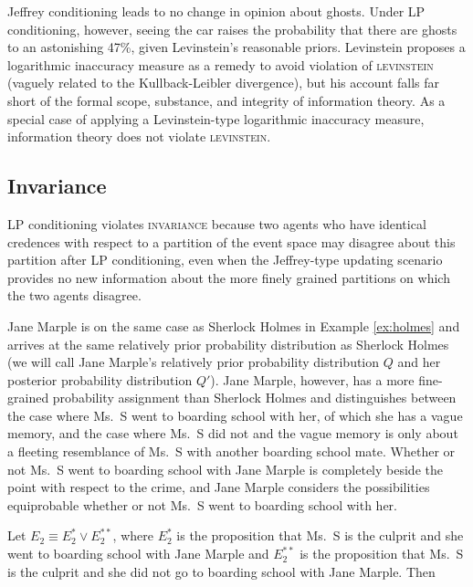 \documentclass[11pt]{article}
\begin{document}
Jeffrey conditioning leads to no change in opinion about ghosts. Under
LP conditioning, however, seeing the car raises the probability that
there are ghosts to an astonishing 47\%, given Levinstein's reasonable
priors. Levinstein proposes a logarithmic inaccuracy measure as a
remedy to avoid violation of \textsc{levinstein} (vaguely related to
the Kullback-Leibler divergence), but his account falls far short of
the formal scope, substance, and integrity of information theory.
As a special case of applying a Levinstein-type logarithmic inaccuracy
measure, information theory does not violate \textsc{levinstein}.

\subsection{Invariance}
\label{Invariance}

LP conditioning violates \textsc{invariance} because two agents who
have identical credences with respect to a partition of the event
space may disagree about this partition after LP conditioning, even
when the Jeffrey-type updating scenario provides no new information
about the more finely grained partitions on which the two agents
disagree. 

\begin{quotex}
  \label{ex:marple} Jane Marple is on the same
  case as Sherlock Holmes in Example \ref{ex:holmes} and arrives at
  the same relatively prior probability distribution as Sherlock
  Holmes (we will call Jane Marple's relatively prior probability
  distribution $Q$ and her posterior probability distribution $Q'$).
  Jane Marple, however, has a more fine-grained probability assignment
  than Sherlock Holmes and distinguishes between the case where Ms.\ S
  went to boarding school with her, of which she has a vague memory,
  and the case where Ms.\ S did not and the vague memory is only about
  a fleeting resemblance of Ms.\ S with another boarding school mate.
  Whether or not Ms.\ S went to boarding school with Jane Marple is
  completely beside the point with respect to the crime, and Jane
  Marple considers the possibilities equiprobable whether or not Ms.\
  S went to boarding school with her.
\end{quotex}

Let $E_{2}\equiv{}E_{2}^{*}\vee{}E_{2}^{**}$, where $E_{2}^{*}$ is the
proposition that Ms.\ S is the culprit and she went to boarding school
with Jane Marple and $E_{2}^{**}$ is the proposition that Ms.\ S is
the culprit and she did not go to boarding school with Jane Marple.
Then
\end{document}
